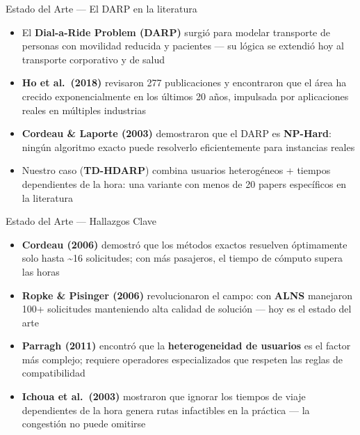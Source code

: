 \documentclass[10pt, aspectratio=169]{beamer}
\begin{document}
\begin{frame}{Estado del Arte — El DARP en la literatura}

  \begin{itemize}\setlength\itemsep{10pt}
    \item El \textbf{Dial-a-Ride Problem (DARP)} surgió para modelar transporte de personas con movilidad reducida y pacientes — su lógica se extendió hoy al transporte corporativo y de salud
    \item \textbf{Ho et al.\ (2018)} revisaron 277 publicaciones y encontraron que el área ha crecido exponencialmente en los últimos 20 años, impulsada por aplicaciones reales en múltiples industrias
    \item \textbf{Cordeau \& Laporte (2003)} demostraron que el DARP es \textbf{NP-Hard}: ningún algoritmo exacto puede resolverlo eficientemente para instancias reales
    \item Nuestro caso (\textbf{TD-HDARP}) combina usuarios heterogéneos + tiempos dependientes de la hora: una variante con menos de 20 papers específicos en la literatura
  \end{itemize}

\end{frame}

\begin{frame}{Estado del Arte — Hallazgos Clave}

  \begin{itemize}\setlength\itemsep{10pt}
    \item \textbf{Cordeau (2006)} demostró que los métodos exactos resuelven óptimamente solo hasta \textasciitilde{}16 solicitudes; con más pasajeros, el tiempo de cómputo supera las horas
    \item \textbf{Ropke \& Pisinger (2006)} revolucionaron el campo: con \textbf{ALNS} manejaron 100+ solicitudes manteniendo alta calidad de solución — hoy es el estado del arte
    \item \textbf{Parragh (2011)} encontró que la \textbf{heterogeneidad de usuarios} es el factor más complejo; requiere operadores especializados que respeten las reglas de compatibilidad
    \item \textbf{Ichoua et al.\ (2003)} mostraron que ignorar los tiempos de viaje dependientes de la hora genera rutas infactibles en la práctica — la congestión no puede omitirse
  \end{itemize}

\end{frame}
\end{document}
